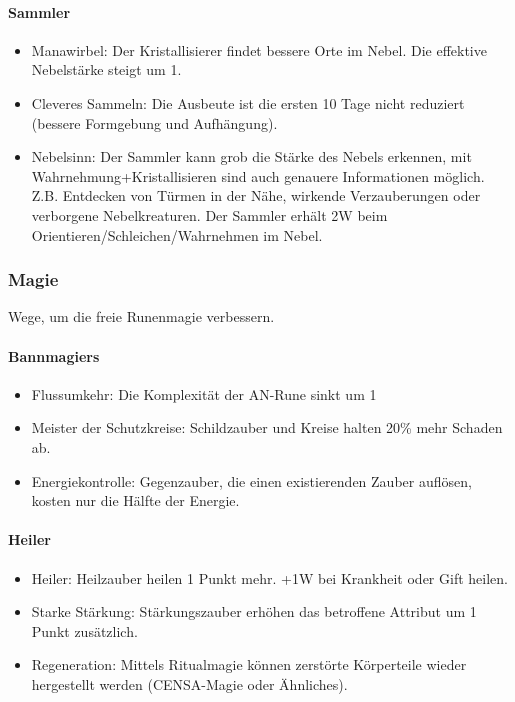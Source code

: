\documentclass{article}
\begin{document}
\paragraph{Sammler}

\begin{itemize}
\item Manawirbel: Der Kristallisierer findet bessere Orte im Nebel. Die effektive Nebelstärke steigt um 1.
\item Cleveres Sammeln: Die Ausbeute ist die ersten 10 Tage nicht reduziert (bessere Formgebung und Aufhängung).
\item Nebelsinn: Der Sammler kann grob die Stärke des Nebels erkennen, mit Wahrnehmung+Kristallisieren sind auch genauere Informationen möglich. Z.B. Entdecken von Türmen in der Nähe, wirkende Verzauberungen oder verborgene Nebelkreaturen. Der Sammler erhält 2W beim Orientieren/Schleichen/Wahrnehmen im Nebel. 
\end{itemize}

\subsubsection{Magie}

Wege, um die freie Runenmagie verbessern.

\paragraph{Bannmagiers}

\begin{itemize}
\item Flussumkehr: Die Komplexität der AN-Rune sinkt um 1
\item Meister der Schutzkreise: Schildzauber und Kreise halten 20\% mehr Schaden ab.
\item Energiekontrolle: Gegenzauber, die einen existierenden Zauber auflösen, kosten nur die Hälfte der Energie.
\end{itemize}

\paragraph{Heiler}

\begin{itemize}
\item Heiler: Heilzauber heilen 1 Punkt mehr. +1W bei Krankheit oder Gift heilen.
\item Starke Stärkung: Stärkungszauber erhöhen das betroffene Attribut um 1 Punkt zusätzlich.
\item Regeneration: Mittels Ritualmagie können zerstörte Körperteile wieder hergestellt werden (CENSA-Magie oder Ähnliches).
\end{itemize}
\end{document}
